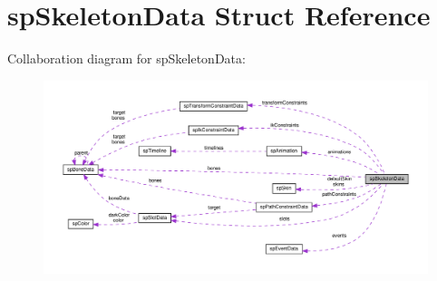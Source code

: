 \hypertarget{structspSkeletonData}{}\section{sp\+Skeleton\+Data Struct Reference}
\label{structspSkeletonData}


Collaboration diagram for sp\+Skeleton\+Data\+:
\nopagebreak
\begin{figure}[H]
\begin{center}
\leavevmode
\includegraphics[width=350pt]{structspSkeletonData__coll__graph}
\end{center}
\end{figure}
